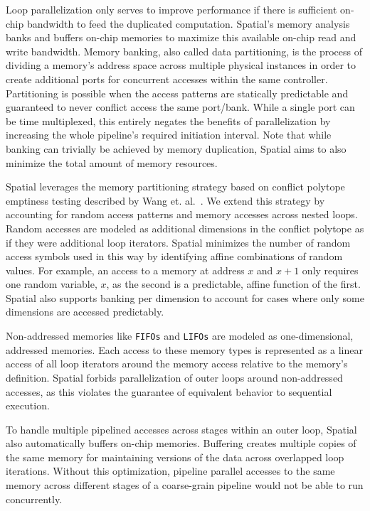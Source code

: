 Loop parallelization only serves to improve performance if there is sufficient on-chip bandwidth to feed the duplicated computation.
Spatial's memory analysis banks and buffers on-chip memories to maximize this available on-chip read and write bandwidth.
Memory banking, also called data partitioning, is the process of dividing a memory's address space across multiple physical instances in order to create
additional ports for concurrent accesses within the same controller.
Partitioning is possible when the access patterns are statically predictable and guaranteed to never conflict access the same port/bank.
While a single port can be time multiplexed, this entirely negates the benefits of parallelization by increasing the whole pipeline's required initiation interval.
Note that while banking can trivially be achieved by memory duplication, Spatial aims to also minimize the total amount of memory resources.

Spatial leverages the memory partitioning strategy based on conflict polytope emptiness testing described by Wang et. al.~\cite{Wang_banking}. We extend this strategy by accounting for random access patterns and memory accesses across nested loops. Random accesses are modeled as additional dimensions in the conflict polytope as if they were additional loop iterators. Spatial minimizes the number of random access symbols used in this way by identifying affine combinations of random values. For example, an access to a memory at address $x$ and $x+1$ only requires one random variable, $x$, as the second is a predictable, affine function of the first.
Spatial also supports banking per dimension to account for cases where only some dimensions are accessed predictably.

Non-addressed memories like \texttt{\small{FIFOs}} and \texttt{\small{LIFOs}}
are modeled as one-dimensional, addressed memories.
Each access to these memory types is represented as a linear access of all loop iterators around the memory access relative to the memory's definition. Spatial forbids parallelization of outer loops around non-addressed accesses, as this violates the guarantee of equivalent behavior to sequential execution.

To handle multiple pipelined accesses across stages within an outer loop, Spatial also automatically buffers on-chip memories.
Buffering creates multiple copies of the
same memory for maintaining versions of the data across overlapped loop iterations.
Without this optimization, pipeline parallel accesses to the same memory across different stages of a coarse-grain pipeline would not be able to run concurrently.

